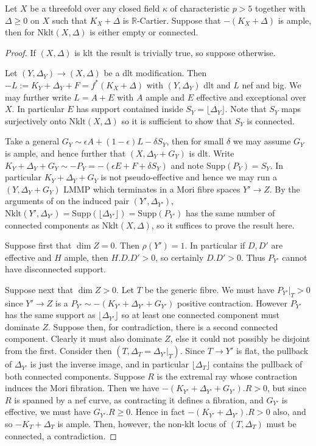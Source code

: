 \documentclass[a4paper,12pt]{book}
\newcommand{\D}{\Delta}
\newcommand{\nklt}{\text{Nklt}}
\begin{document}
\begin{theorem}
	Let $X$ be a threefold over any closed field $\kappa$ of characteristic $p>5$ together with $\Delta\geq 0$ on $X$ such that $K_{X}+\Delta$ is $\mathbb{R}$-Cartier. Suppose that $-(K_{X}+\Delta)$ is ample, then for $\nklt(X,\Delta)$ is either empty or connected. 
\end{theorem}
\begin{proof}
	If $(X,\D)$ is klt the result is trivially true, so suppose otherwise.
	
	Let $(Y,\D_{Y}) \to (X,\D)$ be a dlt modification. Then $-L:=K_{Y}+\D_{Y}+F=f^{*}(K_{X}+\D)$ with $(Y,\D_{Y})$ dlt and $L$ nef and big. We may further write $L=A+E$ with $A$ ample and $E$ effective and exceptional over $X$. In particular $E$ has support contained inside $S_{Y}=\lfloor \D_{Y} \rfloor$. Note that $S_{Y}$ maps surjectively onto $\nklt(X,\D)$ so it is sufficient to show that $S_{Y}$ is connected.
	
	Take a general $G_{Y} \sim \epsilon A +(1-\epsilon) L-\delta S_{Y}$, then for small $\delta$ we may assume $G_{Y}$ is ample, and hence further that $(X,\D_{Y}+G_{Y})$ is dlt. Write $K_{Y}+\D_{Y}+G_{Y}\sim - P_{Y}=-(\epsilon E + F + \delta S_{Y})$ and note $\text{Supp}(P_{Y})=S_{Y}$. In particular $K_{Y}+\D_{Y}+G_{Y}$ is not pseudo-effective and hence we may run a $(Y,\D_{Y}+G_{Y})$ LMMP which terminates in a Mori fibre spaces $Y' \to Z$. By the arguments of \cite[Theorem 9.3]{Bir16} on the induced pair $(Y',\D_{Y'})$, $\nklt(Y',\D_{Y'})=\text{Supp}(\lfloor \D_{Y'} \rfloor)=\text{Supp}(P_{Y'})$ has the same number of connected components as $\nklt(X,\Delta)$, so it suffices to prove the result here.
	
	Suppose first that $\dim Z=0$. Then $\rho(Y')=1$. In particular if $D,D'$ are effective and $H$ ample, then $H.D.D' >0$, so certainly $D.D'>0$. Thus $P_{Y'}$ cannot have disconnected support.
	
	Suppose next that $\dim Z > 0 $. Let $T$ be the generic fibre. We must have $P_{Y'}|_{T}> 0$ since $Y' \to Z$ is a $P_{Y'}\sim -(K_{Y'}+\Delta_{Y'}+G_{Y'})$ positive contraction. However $P_{Y'}$ has the same support as $\lfloor \D_{Y'} \rfloor$ so at least one connected component must dominate $Z$. Suppose then, for contradiction, there is a second connected component. Clearly it must also dominate $Z$, else it could not possibly be disjoint from the first. Consider then $(T,\D_{T}=\D_{Y'}|_{T})$. Since $T \to Y'$ is flat, the pullback of $\D_{Y'}$ is just the inverse image, and in particular $\lfloor \D_{T} \rfloor$ contains the pullback of both connected components. Suppose $R$ is the extremal ray whose contraction induces the Mori fibration. Then we have $-(K_{Y'}+\D_{Y'}+G_{Y'}).R >0$, but since $R$ is spanned by a nef curve, as contracting it defines a fibration, and $G_{Y'}$ is effective, we must have $G_{Y'}.R \geq 0$. Hence in fact $-(K_{Y'}+\D_{Y'}).R >0$ also, and so $-K_{T}+\D_{T}$ is ample. Then, however, the non-klt locus of $(T,\D_{T})$ must be connected, a contradiction.
\end{proof}
	
\end{document}
